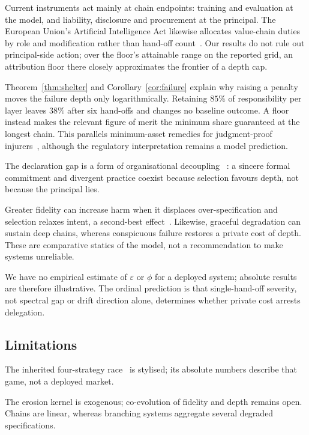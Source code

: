 \documentclass[a4paper,fleqn]{cas-sc}
\begin{document}
Current instruments act mainly at chain endpoints: training and evaluation at
the model, and liability, disclosure and procurement at the principal. The
European Union's Artificial Intelligence Act likewise allocates value-chain
duties by role and modification rather than hand-off count~\citep{euaiact2024}.
Our results do not rule out principal-side action; over the floor's attainable
range on the reported grid, an attribution floor there closely approximates
the frontier of a depth cap.

Theorem~\ref{thm:shelter} and Corollary~\ref{cor:failure} explain why raising a
penalty moves the failure depth only logarithmically. Retaining $85\%$ of
responsibility per layer leaves $38\%$ after six hand-offs and changes no
baseline outcome. A floor instead makes the relevant figure of merit the
minimum share guaranteed at the longest chain. This parallels minimum-asset
remedies for judgment-proof injurers~\citep{shavell1986judgment,shavell2005minimum},
although the regulatory interpretation remains a model prediction.

The declaration gap is a form of organisational decoupling
~\citep{meyer1977myth}: a sincere formal commitment and divergent practice
coexist because selection favours depth, not because the principal lies.

Greater fidelity can increase harm when it displaces over-specification and
selection relaxes intent, a second-best effect~\citep{lipsey1956secondbest}.
Likewise, graceful degradation can sustain deep chains, whereas conspicuous
failure restores a private cost of depth. These are comparative statics of the
model, not a recommendation to make systems unreliable.

We have no empirical estimate of $\varepsilon$ or $\phi$ for a deployed system;
absolute results are therefore illustrative. The ordinal prediction is that
single-hand-off severity, not spectral gap or drift direction alone, determines
whether private cost arrests delegation.

\subsection{Limitations}
\label{sec:limitations}

The inherited four-strategy race~\citep{domingos2026falling} is stylised; its
absolute numbers describe that game, not a deployed market.

The erosion kernel is exogenous; co-evolution of fidelity and depth remains
open. Chains are linear, whereas branching systems aggregate several degraded
specifications.
\end{document}
